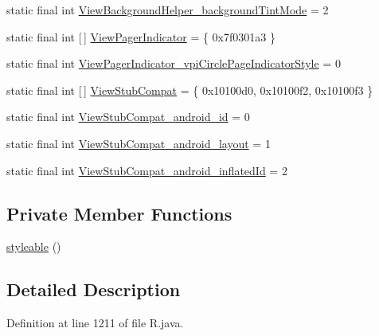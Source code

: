\begin{DoxyCompactItemize}
\item 
static final int \mbox{\hyperlink{classcom_1_1synnapps_1_1carouselview_1_1_r_1_1styleable_aa40d52df845ad58d2462bc1c808da813}{View\+Background\+Helper\+\_\+background\+Tint\+Mode}} = 2
\item 
static final int \mbox{[}$\,$\mbox{]} \mbox{\hyperlink{classcom_1_1synnapps_1_1carouselview_1_1_r_1_1styleable_a69681295a62200faba2b67f50fe948e7}{View\+Pager\+Indicator}} = \{ 0x7f0301a3 \}
\item 
static final int \mbox{\hyperlink{classcom_1_1synnapps_1_1carouselview_1_1_r_1_1styleable_a701a003378a597b31a048108f8f163fa}{View\+Pager\+Indicator\+\_\+vpi\+Circle\+Page\+Indicator\+Style}} = 0
\item 
static final int \mbox{[}$\,$\mbox{]} \mbox{\hyperlink{classcom_1_1synnapps_1_1carouselview_1_1_r_1_1styleable_adb5e3e4aec96ec2adba4fce3740010d5}{View\+Stub\+Compat}} = \{ 0x10100d0, 0x10100f2, 0x10100f3 \}
\item 
static final int \mbox{\hyperlink{classcom_1_1synnapps_1_1carouselview_1_1_r_1_1styleable_ab1f84ebc1c10bb608866e50017eacddb}{View\+Stub\+Compat\+\_\+android\+\_\+id}} = 0
\item 
static final int \mbox{\hyperlink{classcom_1_1synnapps_1_1carouselview_1_1_r_1_1styleable_af546e3478608ea69370c5a3dec545a95}{View\+Stub\+Compat\+\_\+android\+\_\+layout}} = 1
\item 
static final int \mbox{\hyperlink{classcom_1_1synnapps_1_1carouselview_1_1_r_1_1styleable_aff3340e2109d14e612631e3cc298c972}{View\+Stub\+Compat\+\_\+android\+\_\+inflated\+Id}} = 2
\end{DoxyCompactItemize}
\subsection*{Private Member Functions}
\begin{DoxyCompactItemize}
\item 
\mbox{\hyperlink{classcom_1_1synnapps_1_1carouselview_1_1_r_1_1styleable_af9f753a3b7718345c84ab1f1e632bab2}{styleable}} ()
\end{DoxyCompactItemize}


\subsection{Detailed Description}


Definition at line 1211 of file R.\+java.



